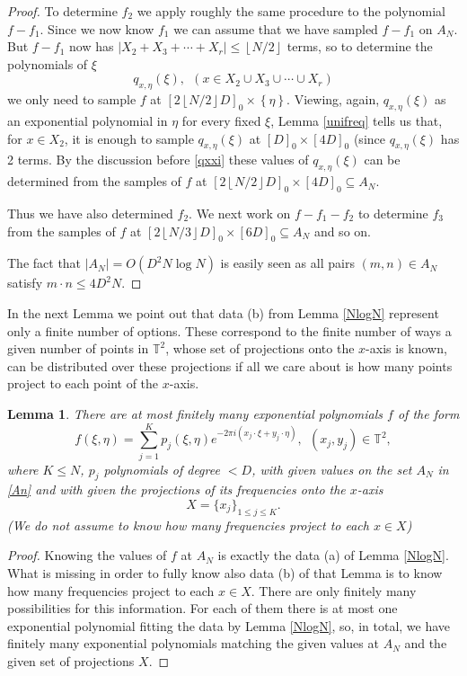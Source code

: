 \documentclass[12pt,a4paper,oneside]{amsart}
\newtheorem{lemma}{Lemma}[section]
\theoremstyle{definition}
\newcommand{\Abs}[1]{{\left|{#1}\right|}}
\newcommand{\Floor}[1]{{\left\lfloor{#1}\right\rfloor}}
\newcommand{\Set}[1]{{\left\{{#1}\right\}}}
\newcommand{\TT}{{\mathbb T}}
\newcommand{\red}[1]{{#1}}
\newcounter{rem}
\begin{document}
\begin{proof}
To determine $f_2$ we apply roughly the same procedure to the polynomial $f-f_1$. Since we now know $f_1$ we can assume that we have sampled $f-f_1$ on $A_N$. But $f-f_1$ now has $\Abs{X_2+X_3+\cdots+X_r} \le \Floor{N/2}$ terms, so  to determine the polynomials of $\xi$
$$
q_{x, \eta}(\xi),\ \ (x \in X_2 \cup X_3 \cup \cdots \cup X_r)
$$
we only need to sample $f$ at $\left[2\Floor{N/2} D\right]_0 \times \Set{\eta}$. Viewing, again, $q_{x, \eta}(\xi)$ as an exponential polynomial in $\eta$ for every fixed $\xi$, Lemma \ref{unifreq} tells us that, for $x \in X_2$, it is enough to sample $q_{x, \eta}(\xi)$ at $[D]_0 \times [4D]_0$ (since $q_{x, \eta}(\xi)$ has 2 terms. By the discussion before \eqref{qxxi} these values of $q_{x, \eta}(\xi)$ can be determined from the samples of $f$ at $[2\Floor{N/2}D]_0 \times [4 D]_0 \subseteq A_N$.

Thus we have also determined $f_2$. We next work on $f-f_1-f_2$ to determine $f_3$ from the samples of $f$ at $[2\Floor{N/3}D]_0 \times [6D]_0 \subseteq A_N$ and so on.

The fact that $\Abs{A_N} = O(D^2 N \log N)$ is easily seen as all pairs $(m, n) \in A_N$ satisfy $m \cdot n \le 4 D^2 N$.


\end{proof}


In the next Lemma we point out that data (b) from Lemma \ref{NlogN} represent only a finite number of options. \red{These correspond to the finite number of ways a given number of points in $\TT^2$, whose set of projections onto the $x$-axis is known, can be distributed over these projections if all we care about is how many points project to each point of the $x$-axis.}


\begin{lemma}\label{finite-number}
There are at most finitely many exponential polynomials $f$ of the form
$$
f(\xi,\eta) = \sum_{j=1}^K p_j (\xi,\eta) e^{-2\pi i (x_j \cdot \xi + y_j \cdot \eta )},\ \ \red{(x_j, y_j) \in \TT^2,}
$$
where $K\le N$,  $p_j$ polynomials of degree $< D$, with given values on the set $A_N$ in \eqref{An} and with given the projections of its frequencies onto the $x$-axis
\begin{equation*}
X = \{x_j\}_{1 \le j \le K}.
\end{equation*}
(We do not assume to know how many frequencies project to each $x\in X$)
\end{lemma}

\begin{proof}
Knowing the values of $f$ at $A_N$ is exactly the data (a) of Lemma \ref{NlogN}. What is missing in order to fully know also data (b) of that Lemma is to know how many frequencies project to each $x\in X$. There are only finitely many possibilities for this information. For each of them there is at most one exponential polynomial fitting the data by Lemma \ref{NlogN}, so, in total, we have finitely many exponential polynomials matching the given values at $A_N$ and the given set of projections $X$.

\end{proof}
\end{document}
